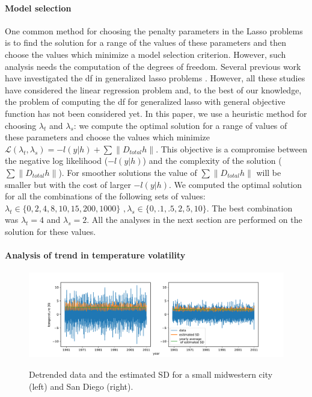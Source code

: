 \documentclass{article}
\begin{document}
\paragraph{Model selection}
One common method for choosing the penalty parameters in the Lasso
problems is to find the solution for a range of the values of these
parameters and then choose the values which minimize a model selection
criterion. However, such analysis needs the computation of the degrees
of freedom. Several previous work have investigated the df in
generalized lasso problems
\citep{tibshirani_degrees_2012,hu_dual_2015,zeng_geometry_2017}. However,
all these studies have considered the linear regression problem and,
to the best of our knowledge, the problem of computing the df for
generalized lasso with general objective function has not been
considered yet. In this paper, we use a heuristic method for choosing $\lambda_t$ and
$\lambda_s$: we compute the optimal solution for a range of values of
these parameters and choose the values which minimize
$\mathscr{L}(\lambda_t,\lambda_s)=-l(y|h)+ \sum \lVert D_{total}h
\lVert$. This objective is a compromise between the negative log
likelihood ($-l(y|h)$) and the complexity of the solution ($\sum
\lVert D_{total}h \lVert$). For smoother solutions the value of $\sum
\lVert D_{total}h \lVert$ will be smaller but with the cost of larger
$-l(y|h)$. We computed the optimal solution for all the combinations of the
following sets of values: $\lambda_t \in \{0,2,4,8,10,15,200,1000\} \, \, ,
\lambda_s \in \{0,.1,.5,2,5,10\}$. The best combination was
$\lambda_t=4$ and $\lambda_s=2$. All the analyses in the next section
are performed on the solution for these values.  


\paragraph{Analysis of trend in temperature volatility}

\begin{figure}[tb]
  \centering
  \includegraphics[width=.8 \columnwidth]{Figures/ts_estimatedVar}\\
  \caption{Detrended data and the estimated SD for
    a small midwestern city (left) and San Diego (right).} 
  \label{fig:avg_change_estimatedSD}
\end{figure} 
\end{document}
